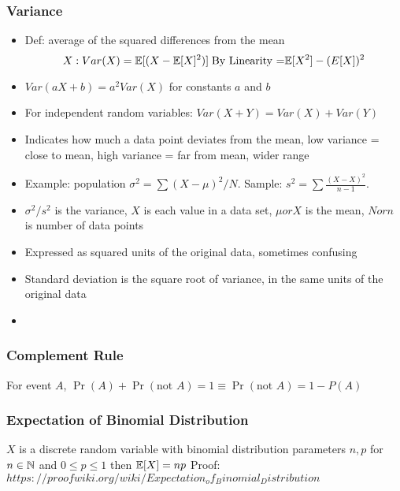 \subsubsection*{Variance}
\begin{itemize}
    \item Def: average of the squared differences from the mean
           \[
                X: Var(X) = \mathbb{E}[(X-\mathbb{E}[X]^2)] \; \text{By Linearity =} \mathbb{E}[X^2] - (E[X])^2
            \]      
    \item $Var(aX + b) = a^2Var(X)$ for constants $a$ and $b$
    \item For independent random variables: $Var(X + Y) = Var(X) + Var(Y)$
    \item Indicates how much a data point deviates from the mean, low variance = close to mean, high variance = far from mean, wider range
    \item Example: population $\sigma^2 = \sum(X - \mu)^2 / N.$ Sample: $s^2 = \sum  \tfrac{(X - X)^2}{n-1}$.
    \item $\sigma^2 / s^2$ is the variance, $X$ is each value in a data set, $\mu or X$ is the mean, $N or n$ is number of data points 
    \item Expressed as squared units of the original data, sometimes confusing
    \item Standard deviation is the square root of variance, in the same units of the original data
    \item 
\end{itemize}

\subsubsection*{Complement Rule}
For event $A$, $\Pr(A) + \Pr(\text{not } A) = 1 \equiv \Pr(\text{not } A) = 1 - P(A)$

\subsubsection*{Expectation of Binomial Distribution}
$X$ is a discrete random variable with binomial distribution parameters $n, p$ for $n \in \mathbb{N}$ and $0 \leq p \leq 1$ then $\mathbb{E}[X] = np$
Proof: $https://proofwiki.org/wiki/Expectation_of_Binomial_Distribution$

